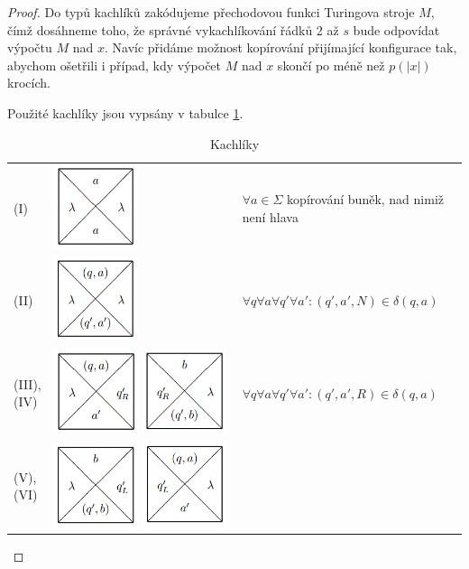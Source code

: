 \documentclass[11pt]{report} %
\numberwithin{equation}{section}
\begin{document}
\begin{proof}
Do typů kachlíků zakódujeme přechodovou funkci Turingova stroje $M$, čímž dosáhneme toho, že správné vykachlíkování řádků 2 až $s$ bude odpovídat výpočtu $M$ nad $x$. Navíc přidáme možnost kopírování přijímající konfigurace tak, abychom ošetřili i případ, kdy výpočet $M$ nad $x$ skončí po méně než $p(|x|)$ krocích.

Použité kachlíky jsou vypsány v tabulce \ref{kachliky}.

\begin{table}[H]
	\centering
	\caption{Kachlíky}
	\label{kachliky}
	\renewcommand{\arraystretch}{1.5}
	\begin{tabular}{| m{0.05\linewidth}  m{0.45\linewidth} | m{0.5\linewidth}| }
		\hline
		(I) & \smallskip\includegraphics[width=70pt]{img/kachl1.png} 
		& $\forall a \in \Sigma$ kopírování buněk, nad nimiž není hlava\\ 
		(II) & \includegraphics[width=70pt]{img/kachl2.png} 
		& $\forall q \forall a \forall q' \forall a' : (q',a',N) \in \delta(q,a)$\\ 
		(III), (IV) & \includegraphics[width=70pt]{img/kachl3.png} \includegraphics[width=70pt]{img/kachl4.png} 
		& $\forall q \forall a \forall q' \forall a' : (q',a',R) \in \delta(q,a)$\\
		(V), (VI) & \includegraphics[width=70pt]{img/kachl5.png} \includegraphics[width=70pt]{img/kachl6.png} 

\end{tabular}
\end{table}
\end{proof}
\end{document}
